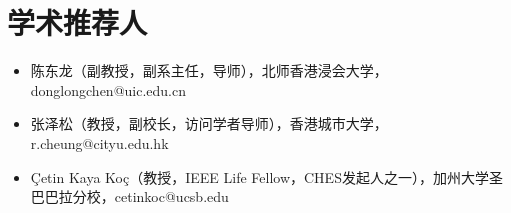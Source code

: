 \documentclass[UTF8,AutoFakeBold]{resume}
\begin{document}
\section{\hspace{0.25em}\makebox[0.75em][c]{\faUsers} \fangsong\textbf{学术推荐人}}
\vspace{0.1em}
    \begin{itemize}
        \item \kaishu 陈东龙（副教授，副系主任，导师），北师香港浸会大学，donglongchen@uic.edu.cn
        \item \kaishu 张泽松（教授，副校长，访问学者导师），香港城市大学，r.cheung@cityu.edu.hk
        \item \kaishu Çetin Kaya Koç（教授，IEEE Life Fellow，CHES发起人之一），加州大学圣巴巴拉分校，cetinkoc@ucsb.edu
    \end{itemize}
\end{document}
